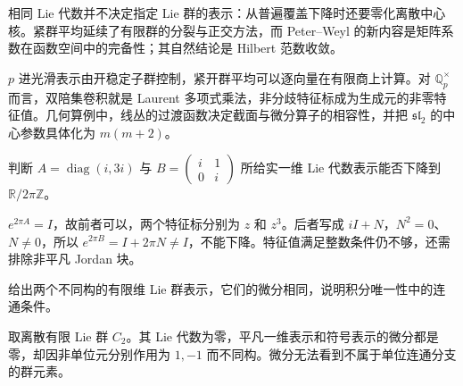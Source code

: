 %
%






\begin{chaptersummary}
	相同 Lie 代数并不决定指定 Lie 群的表示：从普遍覆盖下降时还要零化离散中心核。紧群平均延续了有限群的分裂与正交方法，而 Peter--Weyl 的新内容是矩阵系数在函数空间中的完备性；其自然结论是 Hilbert 范数收敛。

	\ProseParagraphBreak
	\(p\) 进光滑表示由开稳定子群控制，紧开群平均可以逐向量在有限商上计算。对 \(\mathbb Q_p^\times\) 而言，双陪集卷积就是 Laurent 多项式乘法，非分歧特征标成为生成元的非零特征值。几何算例中，线丛的过渡函数决定截面与微分算子的相容性，并把 \(\mathfrak{sl}_2\) 的中心参数具体化为 \(m(m+2)\)。
\end{chaptersummary}

\BookExercises

\begin{exercise}\label{b5:ex:C-circle-jordan}
	判断 \(A=\operatorname{diag}(i,3i)\) 与 \(B=\begin{pmatrix}i&1\\0&i\end{pmatrix}\) 所给实一维 Lie 代数表示能否下降到 \(\mathbb R/2\pi\mathbb Z\)。
\end{exercise}
\begin{solution}
	\(e^{2\pi A}=I\)，故前者可以，两个特征标分别为 \(z\) 和 \(z^3\)。后者写成 \(iI+N\)，\(N^2=0\)、\(N\ne0\)，所以 \(e^{2\pi B}=I+2\pi N\ne I\)，不能下降。特征值满足整数条件仍不够，还需排除非平凡 Jordan 块。
\end{solution}

\begin{exercise}\label{b5:ex:C-disconnected-differential}
	给出两个不同构的有限维 Lie 群表示，它们的微分相同，说明积分唯一性中的连通条件。
\end{exercise}
\begin{solution}
	取离散有限 Lie 群 \(C_2\)。其 Lie 代数为零，平凡一维表示和符号表示的微分都是零，却因非单位元分别作用为 \(1,-1\) 而不同构。微分无法看到不属于单位连通分支的群元素。
\end{solution}

